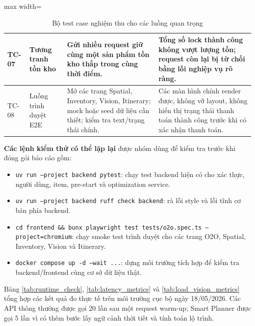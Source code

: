 \documentclass[12pt, a4paper]{article}
\begin{document}
\begin{table}[H]
\begin{adjustbox}{max width=\textwidth}
\begin{tabular}{|>{\raggedright\arraybackslash}p{1.5cm}|>{\raggedright\arraybackslash}p{3.0cm}|>{\raggedright\arraybackslash}p{4.8cm}|>{\raggedright\arraybackslash}p{5.2cm}|}
TC-07 & Tương tranh tồn kho & Gửi nhiều request giữ cùng một sản phẩm tồn kho thấp trong cùng thời điểm. & Tổng số lock thành công không vượt lượng tồn; request còn lại bị từ chối bằng lỗi nghiệp vụ rõ ràng. \\ \hline
TC-08 & Luồng trình duyệt E2E & Mở các trang Spatial, Inventory, Vision, Itinerary; mock hoặc seed dữ liệu cần thiết; kiểm tra text/trạng thái chính. & Các màn hình chính render được, không vỡ layout, không hiển thị trạng thái thanh toán thành công trước khi có xác nhận thanh toán. \\ \hline
\end{tabular}
\end{adjustbox}
\caption{Bộ test case nghiệm thu cho các luồng quan trọng}
\label{tab:test_cases}
\end{table}

\textbf{Các lệnh kiểm thử có thể lặp lại} được nhóm dùng để kiểm tra trước khi đóng gói báo cáo gồm:

\begin{itemize}
    \item \texttt{uv run --project backend pytest}: chạy test backend hiện có cho xác thực, người dùng, item, pre-start và optimization service.
    \item \texttt{uv run --project backend ruff check backend}: rà lỗi style và lỗi tĩnh cơ bản phía backend.
    \item \texttt{cd frontend \&\& bunx playwright test tests/o2o.spec.ts --project=chromium}: chạy smoke test trình duyệt cho các trang O2O, Spatial, Inventory, Vision và Itinerary.
    \item \texttt{docker compose up -d --wait ...}: dựng môi trường tích hợp để kiểm tra backend/frontend cùng cơ sở dữ liệu thật.
\end{itemize}

Bảng \ref{tab:runtime_check}, \ref{tab:latency_metrics} và \ref{tab:load_vision_metrics} tổng hợp các kết quả đo thực tế trên môi trường cục bộ ngày 18/05/2026. Các API thông thường được gọi 20 lần sau một request warm-up; Smart Planner được gọi 5 lần vì có thêm bước lấy ngữ cảnh thời tiết và tính toán lộ trình.
\end{document}
